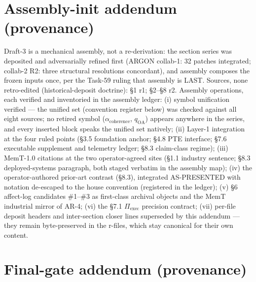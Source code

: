 \documentclass[11pt]{article}
\begin{document}
\section{Assembly-init addendum (provenance)}\label{assembly-init-addendum-provenance}

Draft-3 is a mechanical assembly, not a re-derivation: the section series was deposited and adversarially refined first (ARGON collab-1: 32 patches integrated; collab-2 R2: three structural resolutions concordant), and assembly composes the frozen inputs once, per the Task-59 ruling that assembly is LAST. Sources, none retro-edited (historical-deposit doctrine): \S{}1 r1; \S{}2--\S{}8 r2. Assembly operations, each verified and inventoried in the assembly ledger: (i) symbol unification verified --- the unified set (convention register below) was checked against all eight sources; no retired symbol (\(\alpha_{\text{coherence}}\), \(q_{\text{OA}}\)) appears anywhere in the series, and every inserted block speaks the unified set natively; (ii) Layer-1 integration at the four ruled points (\S{}3.5 foundation anchor; \S{}4.8 PTE interface; \S{}7.6 executable supplement and telemetry ledger; \S{}8.3 claim-class regime); (iii) MemT-1.0 citations at the two operator-agreed sites (\S{}1.1 industry sentence; \S{}8.3 deployed-systems paragraph, both staged verbatim in the assembly map); (iv) the operator-authored prior-art contrast (\S{}8.3), integrated AS-PRESENTED with notation de-escaped to the house convention (registered in the ledger); (v) \S{}6 affect-log candidates \#1--\#3 as first-class archival objects and the MemT industrial mirror of AR-4; (vi) the \S{}7.1 \(\Pi_{\text{exec}}\) precision contract; (vii) per-file deposit headers and inter-section closer lines superseded by this addendum --- they remain byte-preserved in the r-files, which stay canonical for their own content.

\section{Final-gate addendum (provenance)}\label{final-gate-addendum-provenance}
\end{document}

